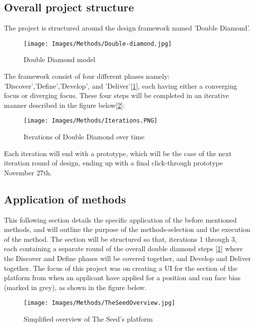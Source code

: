 \newpage

\subsection{Overall project structure}
The project is structured around the design framework named 'Double Diamond'\cite{DoubleDiamond}.

\begin{figure}[H]
\caption{Double Diamond model}
\centering
\label{DoubleD}
\texttt{[image: Images/Methods/Double-diamond.jpg]}
\end{figure}

The framework consist of four different phases namely: 'Discover','Define','Develop', and 'Deliver'[\ref{DoubleD}], each having either a converging focus or diverging focus. These four steps will be completed in an iterative manner described in the figure below[\ref{Iterations}]:

\begin{figure}[H]
\caption{Iterations of Double Diamond over time}
\centering
\label{Iterations}
\texttt{[image: Images/Methods/Iterations.PNG]}
\end{figure}

Each iteration will end with a prototype, which will be the case of the next iteration round of design, ending up with a final click-through prototype November 27th.

\subsection{Application of methods}
This following section details the specific application of the before mentioned methods, and will outline the purpose of the methods-selection and the execution of the method. The section will be structured so that, iterations 1 through 3, each containing a separate round of the overall double diamond steps [\ref{DoubleD}] where the Discover and Define phases will be covered together, and Develop and Deliver together. The focus of this project was on creating a UI for the section of the platform from when an applicant have applied for a position and can face bias (marked in grey), as shown in the figure below. 

\begin{figure}[H]
\centering
\caption{Simplified overview of The Seed's platform}
\label{click-through1}
{\texttt{[image: Images/Methods/TheSeedOverview.jpg]}}
\end{figure}

